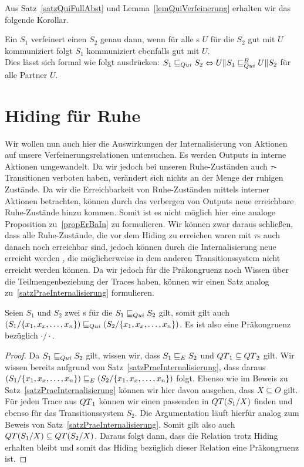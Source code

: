 Aus Satz~\ref{satzQuiFullAbst} und Lemma~\ref{lemQuiVerfeinerung} erhalten wir
das folgende Korollar.

\begin{kor}
  Ein \EIO{} $S_1$ verfeinert einen \EIO{} $S_2$ genau dann, wenn für alle
  \EIO{}s $U$ für die $S_2$ gut mit $U$ kommuniziert folgt $S_1$ kommuniziert
  ebenfalls gut mit $U$.\\
  Dies lässt sich formal wie folgt ausdrücken: $S_1\sqsubseteq _{Qui} S_2\Leftrightarrow
  U\|S_1\sqsubseteq _{Qui}^B U\|S_2$ für alle Partner $U$.
\end{kor}

\section{Hiding für Ruhe}

Wir wollen nun auch hier die Auswirkungen der Internalisierung von Aktionen auf
unsere Verfeinerungsrelationen untersuchen. Es werden Outputs in interne
Aktionen umgewandelt. Da wir jedoch bei unseren Ruhe-Zuständen auch
$\tau$-Transitionen verboten haben, verändert sich nichts an der Menge der ruhigen
Zustände. Da wir die Erreichbarkeit von Ruhe-Zuständen mittels interner Aktionen
betrachten, können durch das verbergen von Outputs neue erreichbare
Ruhe-Zustände hinzu kommen. Somit ist es nicht möglich hier eine analoge
Proposition zu~\ref{propErBaIn} zu formulieren. Wir können zwar daraus
schließen, dass alle Ruhe-Zustände, die vor dem Hiding zu erreichen waren mit
$\tau$s auch danach noch erreichbar sind, jedoch können durch die
Internalisierung neue erreicht werden , die möglicherweise in dem anderen
Transitionssystem nicht erreicht werden können. Da wir jedoch für die
Präkongruenz \QRel{} noch Wissen über die Teilmengenbeziehung der Traces haben,
können wir einen Satz analog zu~\ref{satzPraeInternalisierung} formulieren.

\begin{satz}
  \label{satzPraeInterQui}
  Seien $S_1$ und $S_2$ zwei \EIO{}s für die $S_1\sqsubseteq _{Qui} S_2$ gilt, somit gilt
  auch $(S_1/\{x_1,x_x,\dots ,x_n\})\sqsubseteq _{Qui} (S_2/\{x_1,x_x,\dots ,x_n\})$. Es
  ist also \QRel{} eine Präkongruenz bezüglich $\cdot /\cdot$.
\end{satz}

\begin{proof}
  Da $S_1\sqsubseteq _{Qui} S_2$ gilt, wissen wir, dass $S_1\sqsubseteq _E S_2$ und $QT{}_1\subseteq
  QT{}_2$ gilt. Wir wissen bereits aufgrund von
  Satz~\ref{satzPraeInternalisierung}, dass daraus $(S_1/\{x_1,x_x,\dots
  ,x_n\})\sqsubseteq _E (S_2/\{x_1,x_x,\dots ,x_n\})$ folgt. Ebenso wie im Beweis zu
  Satz~\ref{satzPraeInternalisierung} können wir hier davon ausgehen, dass
  $X\subseteq O$ gilt. Für jeden Trace aus $QT{}_1$ können wir einen passenden in
  $QT{}(S_1/X)$ finden und ebenso für das Transitionssystem $S_2$. Die
  Argumentation läuft hierfür analog zum Beweis von
  Satz~\ref{satzPraeInternalisierung}. Somit gilt
  also auch $QT{}(S_1/X)\subseteq QT{}(S_2/X)$. Daraus folgt dann, dass die
  Relation \QRel{} trotz Hiding erhalten bleibt und somit das Hiding bezüglich
  dieser Relation eine Präkongruenz ist.
\end{proof}

